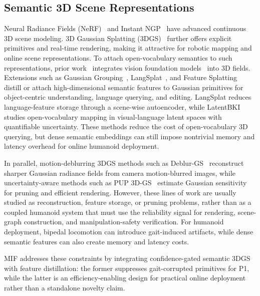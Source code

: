 \documentclass[conference]{IEEEtran}
\begin{document}
\subsection{Semantic 3D Scene Representations}
%
Neural Radiance Fields (NeRF)~\cite{mildenhall2021nerf} and Instant NGP~\cite{muller2022instant} have advanced continuous 3D scene modeling.
%
3D Gaussian Splatting (3DGS)~\cite{kerbl20233d} further offers explicit primitives and real-time rendering, making it attractive for robotic mapping and online scene representations.
%
To attach open-vocabulary semantics to such representations, prior work~\cite{kerr2023lerf, kirillov2023segment, peng2023openscene, shi2024language, kobayashi2022decomposing, engelmann2024opennerf, gadre2023cows} integrates vision foundation models~\cite{kirillov2023segment, radford2021learning, oquab2024dinov2} into 3D fields.
%
Extensions such as Gaussian Grouping~\cite{gaussian_grouping}, LangSplat~\cite{qin2024langsplat}, and Feature Splatting~\cite{qiu2024featuresplatting} distill or attach high-dimensional semantic features to Gaussian primitives for object-centric understanding, language querying, and editing.
%
LangSplat reduces language-feature storage through a scene-wise autoencoder, while LatentBKI~\cite{wilson2025latentbki} studies open-vocabulary mapping in visual-language latent spaces with quantifiable uncertainty.
%
These methods reduce the cost of open-vocabulary 3D querying, but dense semantic embeddings can still impose nontrivial memory and latency overhead for online humanoid deployment.

%
In parallel, motion-deblurring 3DGS methods such as Deblur-GS~\cite{oh2024deblurgs} reconstruct sharper Gaussian radiance fields from camera motion-blurred images, while uncertainty-aware methods such as PUP 3D-GS~\cite{hanson2025pup} estimate Gaussian sensitivity for pruning and efficient rendering.
%
However, these lines of work are usually studied as reconstruction, feature storage, or pruning problems, rather than as a coupled humanoid system that must use the reliability signal for rendering, scene-graph construction, and manipulation-safety verification.
%
For humanoid deployment, bipedal locomotion can introduce gait-induced artifacts, while dense semantic features can also create memory and latency costs.

%
MIF addresses these constraints by integrating confidence-gated semantic 3DGS with feature distillation: the former suppresses gait-corrupted primitives for P1, while the latter is an efficiency-enabling design for practical online deployment rather than a standalone novelty claim.
%
\end{document}
